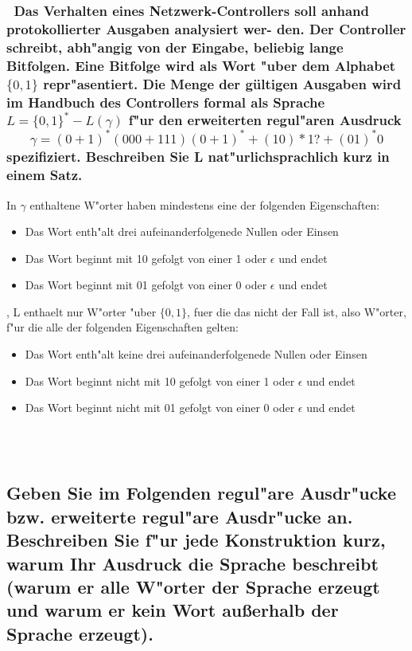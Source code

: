 \documentclass{article}
\newcommand{\gap}{\null\ \\ \\}
\newcommand{\eps}{\epsilon}
\begin{document}
\subsubsection{\
    Das Verhalten eines Netzwerk-Controllers soll anhand protokollierter 
        Ausgaben analysiert wer- den. Der Controller schreibt, abh"angig von der 
        Eingabe, beliebig lange Bitfolgen. Eine Bitfolge wird als Wort "uber dem 
        Alphabet $\{0, 1\}$ repr"asentiert. Die Menge der gültigen Ausgaben wird
        im  Handbuch des Controllers formal als Sprache 
        $L = \{0,1\}^* - L(\gamma)$ f"ur den erweiterten regul"aren Ausdruck\[
            \gamma = (0+1)^* (000 + 111)(0+1)^* + (10)*1? + (01)^*0
            \]
        spezifiziert. Beschreiben Sie L nat"urlichsprachlich kurz in einem Satz.
    }
In $\gamma$ enthaltene W"orter haben mindestens eine der folgenden
Eigenschaften:\\
\begin{itemize}
    \item Das Wort enth"alt drei aufeinanderfolgenede Nullen oder Einsen
    \item Das Wort beginnt mit 10 gefolgt von einer 1 oder $\eps$ und endet
    \item Das Wort beginnt mit 01 gefolgt von einer 0 oder $\eps$ und endet
\end{itemize}
, L enthaelt nur W"orter "uber $\{0, 1\}$, fuer die das nicht der Fall ist,
    also W"orter, f"ur die alle der folgenden Eigenschaften gelten:\\
\begin{itemize}
    \item Das Wort enth"alt keine drei aufeinanderfolgenede Nullen oder Einsen
    \item Das Wort beginnt nicht mit 10 gefolgt von einer 1 oder $\eps$ und 
            endet
    \item Das Wort beginnt nicht mit 01 gefolgt von einer 0 oder $\eps$ und 
            endet
\end{itemize}

\gap
\subsection{
    Geben Sie im Folgenden regul"are Ausdr"ucke bzw. erweiterte regul"are 
        Ausdr"ucke an. Beschreiben Sie f"ur jede Konstruktion kurz, warum Ihr 
        Ausdruck die Sprache beschreibt (warum er alle W"orter der Sprache 
        erzeugt und warum er kein Wort außerhalb der Sprache erzeugt).
    }
\end{document}
